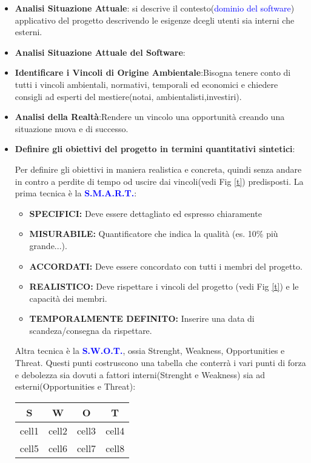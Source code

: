 \documentclass{article}
\begin{document}
\begin{itemize}

\item \textbf{Analisi Situazione Attuale}: si descrive il contesto(\textcolor{blue}{dominio del software}) applicativo del progetto descrivendo le esigenze dcegli utenti sia interni che esterni.

\item \textbf{Analisi Situazione Attuale del Software}:

\item \textbf{Identificare i Vincoli di Origine Ambientale}:Bisogna tenere conto di tutti i vincoli ambientali, normativi, temporali ed economici e chiedere consigli ad esperti del mestiere(notai, ambientalisti,investiri).

\item \textbf{Analisi della Realtà}:Rendere un vincolo una opportunità creando una situazione nuova e di successo.

\item \textbf{Definire gli obiettivi del progetto in termini quantitativi sintetici}:

Per definire gli obiettivi in maniera realistica e concreta, quindi senza andare in contro a perdite di tempo od uscire dai vincoli(vedi Fig \ref{t}) predisposti.
La prima tecnica è la \textbf{\textcolor{blue}{S.M.A.R.T.}}:
\begin{itemize}
\item \textbf{SPECIFICI:} Deve essere dettagliato ed espresso chiaramente
\item \textbf{MISURABILE:} Quantificatore che indica la qualità (es. 10\% più grande...).
\item \textbf{ACCORDATI:} Deve essere concordato con tutti i membri del progetto.
\item \textbf{REALISTICO:} Deve rispettare i vincoli del progetto (vedi Fig \ref{t}) e le capacità dei membri.
\item \textbf{TEMPORALMENTE DEFINITO:} Inserire una data di scandeza/consegna da rispettare.
\end{itemize}
Altra tecnica è la \textbf{\textcolor{blue}{S.W.O.T.}}, ossia Strenght, Weakness, Opportunities e Threat.
Questi punti costruscono una tabella che conterrà i vari punti di forza e debolezza sia dovuti a fattori interni(Strenght e Weakness) sia ad esterni(Opportunities e Threat):

\begin{center}
\begin{tabular}{ |c|c|c|c| } 
 \hline
 S & W & O & T \\ [0.5ex] 
 \hline\hline
 cell1 & cell2 & cell3 & cell4 \\
 cell5 & cell6 & cell7 & cell8 \\
 \hline
\end{tabular}
\end{center}




\end{itemize}
\end{document}
